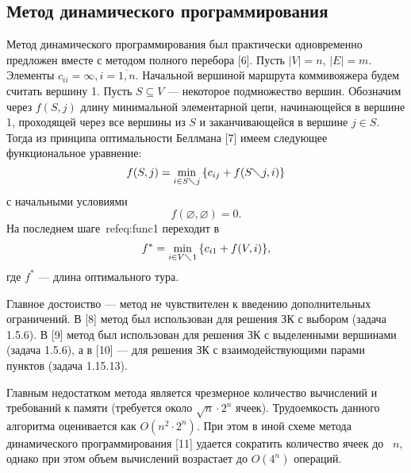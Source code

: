 \subsection{Метод динамического программирования}
Метод динамического программирования был практически одновременно предложен вместе с методом полного перебора [6].
Пусть $|V|=n$, $|E|=m$. Элементы $c_{ii}= \infty, i=\overline{1,n}$. Начальной вершиной маршрута коммивояжера будем считать вершину 1. Пусть $S \subseteq V$ --- некоторое подмножество вершин. Обозначим через $f(S, j)$ длину минимальной элементарной цепи, начинающейся в вершине 1, проходящей через все вершины из $S$ и заканчивающейся в вершине $j \in S$. Тогда из принципа оптимальности Беллмана [7] имеем следующее функциональное уравнение: 
\begin{equation}
    \label{eq:func1}
    f(S, j) = \min_{i\in S\diagdown j}{\{c_{ij}+f(S\diagdown j, i)\}}
\end{equation}
с начальными условиями
\begin{equation}
    \label{eq:func2}
    f(\varnothing,\varnothing) = 0.
\end{equation}
На последнем шаге~ref{eq:func1} переходит в
\begin{equation}
    \label{eq:func2}
    f^* = \min_{i\in V\diagdown 1}{\{c_{i1}+f(V, i)\}},
\end{equation}
где $f^*$ --- длина оптимального тура.

Главное достоиство --- метод не чувствителен к введению дополнительных ограничений. В [8] метод был использован для решения ЗК с выбором (задача 1.5.6). В [9] метод был использован для решения ЗК с выделенными вершинами (задача 1.5.6), а в [10] --- для решения ЗК с взаимодействующими парами пунктов (задача 1.15.13).

Главным недостатком метода является чрезмерное количество вычислений и требований к памяти (требуется около $\sqrt{n}\cdot2^n$ ячеек). Трудоемкость данного алгоритма оценивается как $O(n^2\cdot2^n)$. При этом в иной схеме метода динамического программирования [11] удается сократить количество ячеек до ~$n$, однако при этом объем вычислений возрастает до $O(4^n)$ операций. 

